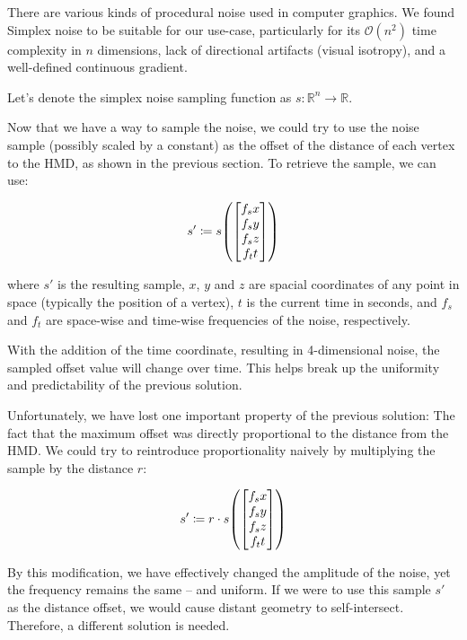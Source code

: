There are various kinds of procedural noise used in computer graphics. We found Simplex noise \autocite{olano2002simplex} to be suitable for our use-case, particularly for its $\mathcal{O}(n^2)$ time complexity in $n$ dimensions, lack of directional artifacts (visual isotropy), and a well-defined continuous gradient.

Let's denote the simplex noise sampling function as $s \colon \mathbb{R}^n \to \mathbb{R}$.

Now that we have a way to sample the noise, we could try to use the noise sample (possibly scaled by a constant) as the offset of the distance of each vertex to the \ac{HMD}, as shown in the previous section. To retrieve the sample, we can use:

\begin{equation}\label{eq:simplex}
    s' \coloneqq s\mleft(\begin{bmatrix}f_sx\\f_sy\\f_sz\\f_tt\end{bmatrix}\mright)
\end{equation}

where $s'$ is the resulting sample, $x$, $y$ and $z$ are spacial coordinates of any point in space (typically the position of a vertex), $t$ is the current time in seconds, and $f_s$ and $f_t$ are space-wise and time-wise frequencies of the noise, respectively.

With the addition of the time coordinate, resulting in 4-dimensional noise, the sampled offset value will change over time. This helps break up the uniformity and predictability of the previous solution.

Unfortunately, we have lost one important property of the previous solution: The fact that the maximum offset was directly proportional to the distance from the \ac{HMD}. We could try to reintroduce proportionality naively by multiplying the sample by the distance $r$:

\begin{equation}
    s' \coloneqq r \cdot s\mleft(\begin{bmatrix}f_sx\\f_sy\\f_sz\\f_tt\end{bmatrix}\mright)
\end{equation}

By this modification, we have effectively changed the amplitude of the noise, yet the frequency remains the same -- and uniform. If we were to use this sample $s'$ as the distance offset, we would cause distant geometry to self-intersect. Therefore, a different solution is needed.

